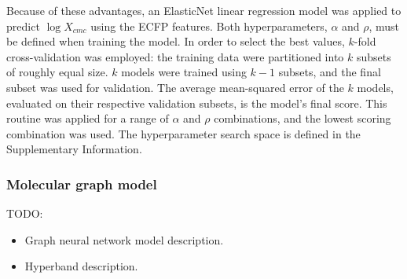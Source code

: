 Because of these advantages, an ElasticNet linear regression model was applied
to predict $\log X_{cmc}$ using the ECFP features. Both hyperparameters,
$\alpha$ and $\rho$, must be defined when training the model. In order to select
the best values, $k$-fold cross-validation was employed: the training data were
partitioned into $k$ subsets of roughly equal size. $k$ models were trained
using $k-1$ subsets, and the final subset was used for validation. The average
mean-squared error of the $k$ models, evaluated on their respective validation
subsets, is the model's final score. This routine was applied for a range of
$\alpha$ and $\rho$ combinations, and the lowest scoring combination was used.
The hyperparameter search space is defined in the Supplementary Information.

\subsubsection{Molecular graph model}

TODO:
\begin{itemize}
    \item Graph neural network model description.
    \item Hyperband description.
\end{itemize}